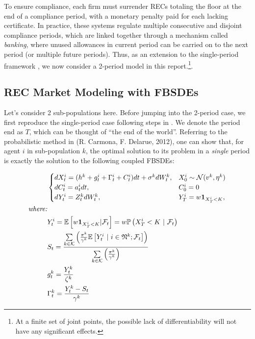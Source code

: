 \documentclass[a4paper,10pt]{article}
\newcommand{\1}{\mathbf{1}}
\begin{document}
To ensure compliance, each firm must surrender RECs totaling the floor
at the end of a compliance period, with a monetary penalty paid for each
lacking certificate. In practice, these systems regulate multiple
consecutive and disjoint compliance periods, which are linked together
through a mechanism called \emph{banking}, where unused allowances in
current period can be carried on to the next period (or multiple future
periods). Thus, as an extension to the single-period framework \cite{SC}, we
now consider a 2-period model in this report.\footnote{At a finite set
  of joint points, the possible lack of differentiability will not have
  any significant effects.}.

\subsection{REC Market Modeling with
FBSDEs}\label{rec-market-modeling}

Let's consider 2 sub-populations here. Before jumping into the 2-period
case, we first reproduce the single-period case following steps in \cite{SC}. We
denote the period end as \(T\), which can be thought of ``the end of the
world''. Referring to the probabilistic method in \cite{RC} (R. Carmona, F. Delarue,
2012), one can show that, for agent \(i\) in sub-population \(k\), the
optimal solution to its problem in a \emph{single} period is exactly the
solution to the following coupled FBSDEs:

\begin{alignat}{2}
    &\begin{cases}
        dX_t^{i} = (h^{k} + g_t^{i} + \Gamma_t^{i} + C_t^{i})dt + \sigma^{k}dW_t^{k},  &X_0^{i} \sim \mathcal{N}(v^k,\eta^k) \notag \\
        dC_t^{i} = a_t^{i}dt, &C_0^{i}=0 \notag \\
        dY_t^{i} = Z_t^{k}dW_t^{k}, &Y_{T}^{i} = w\mathbf{1}_{X_{T}^i<K}, \notag \\
    \end{cases}\\
    \textit{where:}&\\
        &Y_t^i = \mathbb{E} \left[w\mathbf{1}_{X_{T}^i< K}|\mathcal{F}_t \right] = w\mathbb{P}\left(X_{T}^i< K ~|~ \mathcal {F}_t\right) \notag \\
        &S_t = \frac{\sum\limits_{k \in \mathcal{K}} {\left(\frac{\pi^k}{\gamma^k}\mathbb{E}\left[ Y_t^i ~|~ i \in \mathfrak{N}^k; \mathcal{F}_t \right]\right)} }{\sum\limits_{k \in \mathcal{K}}{\left(\frac{\pi^k}{\gamma^k}\right)}} \notag \\
        &g_t^k = \frac{Y_t^k}{\zeta^k} \notag \\
        &\Gamma_t^{k} = \frac{Y_t^{k}-S_t}{\gamma^{k}} 
\end{alignat}
\end{document}
